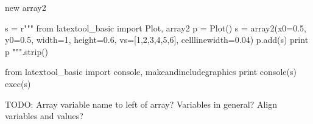 \newpage
new array2
\begin{python}
s = r"""
from latextool_basic import Plot, array2
p = Plot()
s = array2(x0=0.5, y0=0.5, width=1, height=0.6, 
           vs=[1,2,3,4,5,6],
           celllinewidth=0.04)
p.add(s)
print p
""".strip()

from latextool_basic import console, makeandincludegraphics
print console(s)
exec(s)
\end{python}



TODO: Array variable name to left of array?
Variables in general?
Align variables and values?
